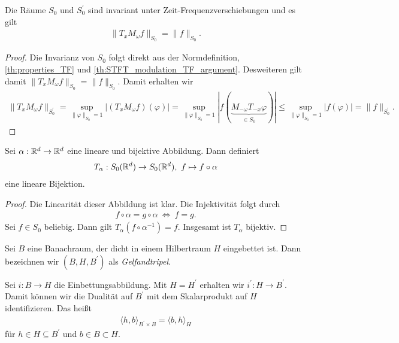 \begin{lem}
	Die Räume $ S_0 $ und $ S_0^\prime  $ sind invariant unter Zeit-Frequenzverschiebungen und es gilt
	\begin{align}
	\| T_x M_\omega f \|_{S_0} = \| f \|_{S_0}.
	\end{align}
\end{lem}

\begin{proof}
	Die Invarianz von $ S_0  $ folgt direkt aus der Normdefinition, \ref{th:properties_TF} und \ref{th:STFT_modulation_TF_argument}.
	Desweiteren gilt damit $ \| T_x M_\omega f \|_{S_0}  = \| f \|_{S_0} $.
	Damit erhalten wir 
	\begin{align*}
	\|T_x M_\omega f \|_{S_0^\prime}
	=
	\sup \limits_{\| \varphi \|_{S_0} = 1} | (T_x M_\omega f)(\varphi) |  
	=
	\sup \limits_{\| \varphi \|_{S_0} = 1} | f(\underbrace{M_{-\omega} T_{-x} \varphi}_{\in S_0}) |
	\leq 
	\sup \limits_{\| \varphi \|_{S_0} = 1} | f( \varphi) |
	= \| f \|_{S_0^\prime}.
	\end{align*}
\end{proof}

\begin{sz}
	Sei $ \alpha : \mathbb{R}^d \to \mathbb{R}^d $ eine lineare und bijektive Abbildung.
	Dann definiert
	\begin{align}
	T_\alpha : S_0(\mathbb{R}^d) \to S_0(\mathbb{R}^d), \ f \mapsto  f \circ \alpha
	\end{align}
	eine lineare Bijektion. 
\end{sz}

\begin{proof}
	Die Linearität dieser Abbildung ist klar.
	Die Injektivität folgt durch
	\begin{align*}
	f \circ \alpha = 
	g \circ \alpha 
	\ \Leftrightarrow \ f = g.
	\end{align*}
	Sei $ f\in S_0 $ beliebig.
	Dann gilt $ T_\alpha (f \circ \alpha^{-1}) = f $.
	Insgesamt ist $ T_\alpha $ bijektiv.
\end{proof}

\begin{df}
	Sei $ B $ eine Banachraum, der dicht in einem Hilbertraum $ H $ eingebettet ist.
	Dann bezeichnen wir $ (B,H,B^\prime) $ als \textit{Gelfandtripel}.
\end{df}

Sei $ i : B \to H  $ die Einbettungsabbildung. Mit $ H = H^\prime $ erhalten wir $ i^\prime : H \to B^\prime $.
Damit können wir die Dualität auf $ B^\prime $ mit dem Skalarprodukt auf $ H $ identifizieren. Das heißt
\begin{align}
\langle h, b \rangle_{B^\prime \times B}
=
\langle b, h \rangle_H
\end{align}
für $ h \in H \subseteq B^\prime $ und $ b \in B \subset H $.

